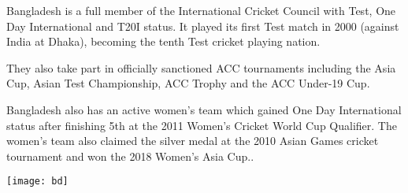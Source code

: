 \documentclass[12pt, letterpaper]{article}
\begin{document}
{\begin{enumerate}
{Bangladesh is a full member of the International Cricket Council with Test, One Day International and T20I status. It played its first Test match in 2000 (against India at Dhaka), becoming the tenth Test cricket playing nation.

They also take part in officially sanctioned ACC tournaments including the Asia Cup, Asian Test Championship, ACC Trophy and the ACC Under-19 Cup.

Bangladesh also has an active women's team which gained One Day International status after finishing 5th at the 2011 Women's Cricket World Cup Qualifier. The women's team also claimed the silver medal at the 2010 Asian Games cricket tournament and won the 2018 Women's Asia Cup..}
\end{enumerate}
}
\texttt{[image: bd]}
\end{document}
